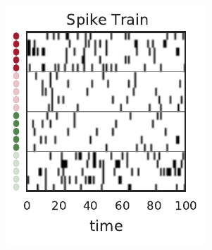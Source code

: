 \begin{figure}[t!]
\begin{subfigure}[b]{1.6in}
    \label{fig:representation_population}
  \end{subfigure}
  \begin{subfigure}[b]{1.9in}
    \centering
    \caption{}
    \vspace{-.3in}
    \includegraphics[width=\textwidth]{figures/ch9/example_spiketrain}
    \label{fig:representation_spiketrain}
  \end{subfigure}
  \begin{subfigure}[b]{1.8in}
    \centering
    \caption{}
    \vspace{-.3in}

\end{subfigure}
\end{figure}
